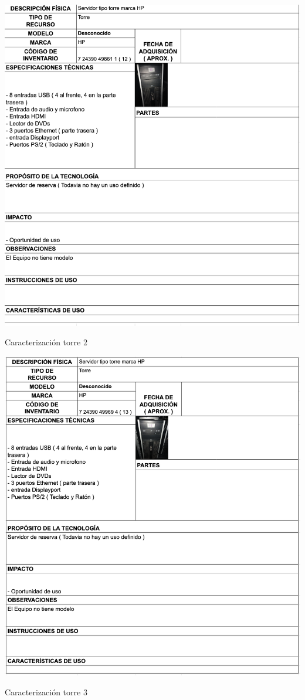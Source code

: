 \begin{table}[H]
    \centering
    \includegraphics[width=\textwidth]{tablas-images/cp1/torres/torre-2.png}
    \caption{Caracterización torre 2}\label{tab:torre-2}
\end{table}

\begin{table}[H]
    \centering
    \includegraphics[width=\textwidth]{tablas-images/cp1/torres/torre-3.png}
    \caption{Caracterización torre 3}\label{tab:torre-3}
\end{table}


